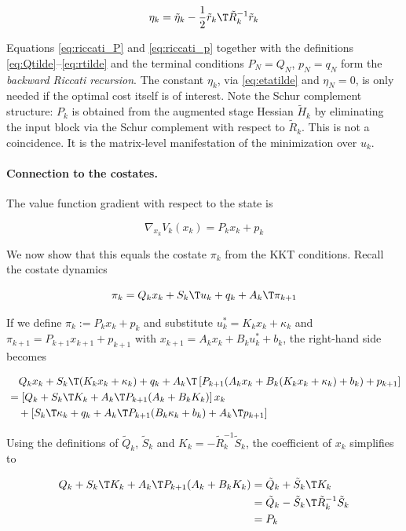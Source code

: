 \[
\eta_k = \tilde{\eta}_k - \frac{1}{2}\tilde{r}_k\T \tilde{R}_k^{-1} \tilde{r}_k
\]

Equations \eqref{eq:riccati_P} and \eqref{eq:riccati_p} together with the definitions \eqref{eq:Qtilde}--\eqref{eq:rtilde} and the terminal conditions $P_N = Q_N$, $p_N = q_N$ form the \textit{backward Riccati recursion}.
The constant $\eta_k$, via \eqref{eq:etatilde} and $\eta_N = 0$, is only needed if the optimal cost itself is of interest.
Note the Schur complement structure: $P_k$ is obtained from the augmented stage Hessian $\tilde{H}_k$ by eliminating the input block via the Schur complement with respect to $\tilde{R}_k$.
This is not a coincidence.
It is the matrix-level manifestation of the minimization over $u_k$.

\paragraph{Connection to the costates.}
The value function gradient with respect to the state is

\[
\nabla_{x_k} V_k(x_k) = P_k x_k + p_k
\]

We now show that this equals the costate $\pi_k$ from the KKT conditions.
Recall the costate dynamics

\[
\pi_k = Q_k x_k + S_k\T u_k + q_k + A_k\T \pi_{k+1}
\]

If we define $\pi_k := P_k x_k + p_k$ and substitute $u_k^* = K_k x_k + \kappa_k$ and $\pi_{k+1} = P_{k+1} x_{k+1} + p_{k+1}$ with $x_{k+1} = A_k x_k + B_k u_k^* + b_k$, the right-hand side becomes

\begin{align*}
&\phantom{=}\; Q_k x_k + S_k\T (K_k x_k + \kappa_k) + q_k + A_k\T \left[ P_{k+1}(A_k x_k + B_k (K_k x_k + \kappa_k) + b_k) + p_{k+1} \right] \\
&= \left[ Q_k + S_k\T K_k + A_k\T P_{k+1}(A_k + B_k K_k) \right] x_k \\
&\quad + \left[ S_k\T \kappa_k + q_k + A_k\T P_{k+1}(B_k \kappa_k + b_k) + A_k\T p_{k+1} \right]
\end{align*}

Using the definitions of $\tilde{Q}_k$, $\tilde{S}_k$ and $K_k = -\tilde{R}_k^{-1}\tilde{S}_k$, the coefficient of $x_k$ simplifies to

\begin{align*}
Q_k + S_k\T K_k + A_k\T P_{k+1}(A_k + B_k K_k)
&= \tilde{Q}_k + \tilde{S}_k\T K_k \\
&= \tilde{Q}_k - \tilde{S}_k\T \tilde{R}_k^{-1} \tilde{S}_k \\
&= P_k
\end{align*}

